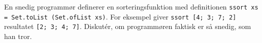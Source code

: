 En snedig programmør definerer en sorteringsfunktion med definitionen \lstinline{ssort xs = Set.toList (Set.ofList xs)}. For eksempel giver \lstinline{ssort [4; 3; 7; 2]} resultatet \lstinline{[2; 3; 4; 7]}.  Diskut\'{e}r, om programmøren faktisk er så snedig, som han tror.
